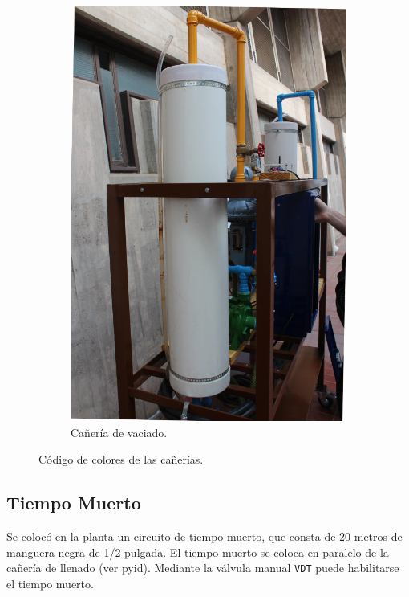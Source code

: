 \begin{figure}[t]
\begin{subfigure}[b]{0.40\textwidth}
\includegraphics[width=\textwidth]{Cap2-DisenoEnsamblado/images/caneria2.JPG}
	\caption{Cañería de vaciado.}
        \end{subfigure}
        \caption{Código de colores de las cañerías.}
        \label{fig:canerias}
\end{figure}

\subsection{Tiempo Muerto}
\label{subsec:tiempoMuerto}
Se colocó en la planta un circuito de tiempo muerto, que consta de 20 metros de
manguera negra de 1/2 pulgada.
El tiempo muerto se coloca en paralelo de la cañería de llenado (ver
\gls{pyid}).
Mediante la válvula manual \verb|VDT| puede habilitarse el tiempo muerto.

